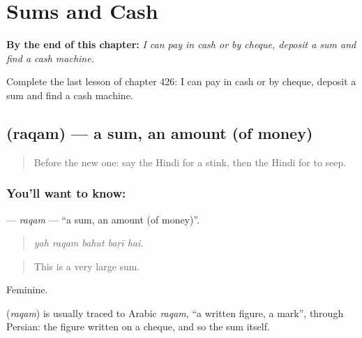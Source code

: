 
\chapter{Sums and Cash}
\label{ch:hi-sums-and-cash}

\begin{chapteropening}
\textbf{By the end of this chapter:} \emph{I can pay in cash or by cheque, deposit a sum and find a cash machine.}

Complete the last lesson of chapter 426: I can pay in cash or by cheque, deposit a sum and find a cash machine.
\end{chapteropening}

\section[\texorpdfstring{\hi{रक़म} (raqam)}{रक़म (raqam)}]{ (raqam) — a sum, an amount (of money)}

\label{lesson:HI-C426-raqam}



\begin{quote}
Before the new one: say the Hindi for a stink, then the Hindi for to seep.
\end{quote}

\subsection*{You'll want to know: }
\textbf{} — \emph{raqam} — \textquotedblleft{}a sum, an amount (of money)\textquotedblright{}.

\begin{quote}
    
\end{quote}

\begin{quote}
\emph{yah raqam bahut baṛī hai.}
\end{quote}

\begin{quote}
This is a very large sum.
\end{quote}

Feminine.

\begin{cousinweb}
\textbf{} (\emph{raqam}) is usually traced to Arabic \emph{raqam}, \textquotedblleft{}a written figure, a mark\textquotedblright{}, through Persian: the figure written on a cheque, and so the sum itself.
\end{cousinweb}

